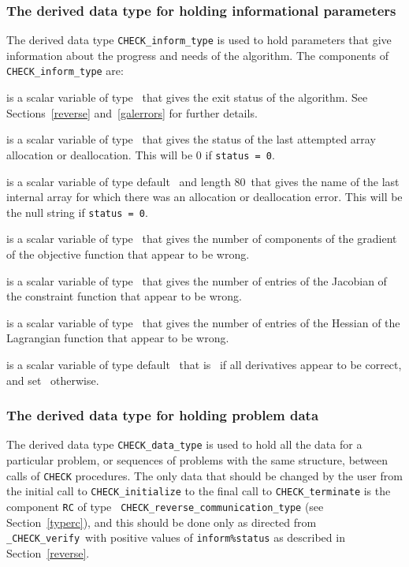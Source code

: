 \documentclass{galahad}
\newcommand{\packagename}{CHECK}
\newcommand{\fullpackagename}{\libraryname\_\packagename}
\newcommand{\solver}{{\tt \fullpackagename\_verify}}
\begin{document}

\subsubsection{The derived data type for holding informational
 parameters}\label{typeinform}
The derived data type 
{\tt \packagename\_inform\_type} 
is used to hold parameters that give information about the progress and needs 
of the algorithm. The components of 
{\tt \packagename\_inform\_type} 
are:

\begin{description}

 is a scalar variable of type \integer\ that gives the
exit status of the algorithm.  See Sections~\ref{reverse} and~\ref{galerrors} for further details.

 is a scalar variable of type \integer\ that gives
the status of the last attempted array allocation or deallocation.
This will be 0 if {\tt status = 0}.

 is a scalar variable of type default \character\
and length 80\ that gives the name of the last internal array 
for which there was an allocation or deallocation error.
This will be the null string if {\tt status = 0}.

 is a scalar variable of type \integer\ that gives the
number of components of the gradient of the objective function that
appear to be wrong.

 is a scalar variable of type \integer\ that gives the
number of entries of the Jacobian of the constraint function that
appear to be wrong.

 is a scalar variable of type \integer\ that gives the
number of entries of the Hessian of the Lagrangian function that
appear to be wrong.

 is a scalar variable of type default \logical\
that is \true\ if all derivatives appear to be correct, and set
\false\ otherwise. 

\end{description}


\subsubsection{The derived data type for holding problem data}\label{typedata}
The derived data type 
{\tt \packagename\_data\_type} 
is used to hold all the data for a particular problem,
or sequences of problems with the same structure, between calls of 
{\tt \packagename} procedures.  The only data that should be changed
by the user from the initial call to 
{\tt \packagename\_initialize}
to the final call to
{\tt \packagename\_terminate} is the component {\tt RC} of type {\tt
  \packagename\_reverse\_communication\_type} (see Section~\ref{typerc}), and this should be done
only as directed from \solver\ with positive values of {\tt inform\%status} as
described in Section~\ref{reverse}.
\end{document}
